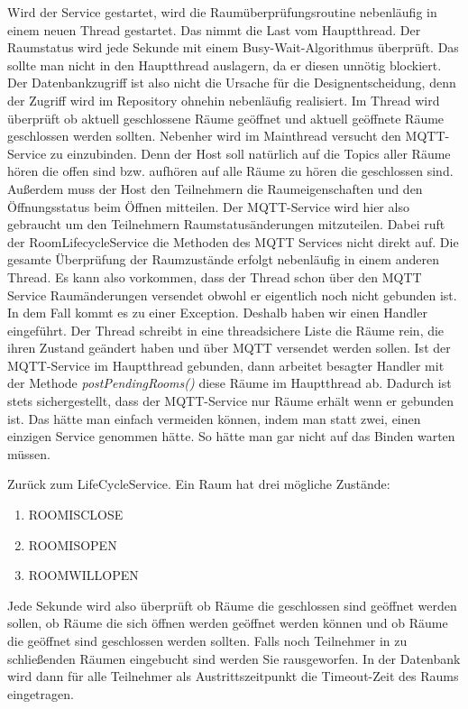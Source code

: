 Wird der Service gestartet, wird die Raumüberprüfungsroutine nebenläufig in einem neuen Thread gestartet. Das nimmt die Last vom Hauptthread. Der Raumstatus wird jede Sekunde mit einem Busy-Wait-Algorithmus überprüft. Das sollte man nicht in den Hauptthread auslagern, da er diesen unnötig blockiert. 
Der Datenbankzugriff ist also nicht die Ursache für die Designentscheidung, denn der Zugriff wird im Repository ohnehin nebenläufig realisiert.
Im Thread wird überprüft ob aktuell geschlossene Räume geöffnet und aktuell geöffnete Räume geschlossen werden sollten.
Nebenher wird im Mainthread versucht den MQTT-Service zu einzubinden. Denn der Host soll natürlich auf die Topics aller Räume hören die offen sind bzw. aufhören auf alle Räume zu hören die geschlossen sind.
Außerdem muss der Host den Teilnehmern die Raumeigenschaften und den Öffnungsstatus beim Öffnen mitteilen. Der MQTT-Service wird hier also gebraucht um den Teilnehmern Raumstatusänderungen mitzuteilen.
Dabei ruft der RoomLifecycleService die Methoden des MQTT Services nicht direkt auf. Die gesamte Überprüfung der Raumzustände erfolgt nebenläufig in einem anderen Thread. 
Es kann also vorkommen, dass der Thread schon über den MQTT Service Raumänderungen versendet obwohl er eigentlich noch nicht gebunden ist. In dem Fall kommt es zu einer Exception.
Deshalb haben wir einen Handler eingeführt. Der Thread schreibt in eine threadsichere Liste die Räume rein, die ihren Zustand geändert haben und über MQTT versendet werden sollen. 
Ist der MQTT-Service im Hauptthread gebunden, dann arbeitet besagter Handler mit der Methode \textit{postPendingRooms()} diese Räume im Hauptthread ab. 
Dadurch ist stets sichergestellt, dass der MQTT-Service nur Räume erhält wenn er gebunden ist. Das hätte man einfach vermeiden können, indem man statt zwei, einen einzigen Service genommen hätte. So hätte man gar nicht auf das Binden warten müssen.

Zurück zum LifeCycleService.
Ein Raum hat drei mögliche Zustände:
\begin{enumerate}
\item ROOMISCLOSE
\item ROOMISOPEN
\item ROOMWILLOPEN
\end{enumerate}
 Jede Sekunde wird also überprüft ob Räume die geschlossen sind geöffnet werden sollen, ob Räume die sich öffnen werden geöffnet werden können und ob Räume die geöffnet sind geschlossen werden sollten. 
Falls noch Teilnehmer in zu schließenden Räumen eingebucht sind werden Sie rausgeworfen. In der Datenbank wird dann für alle Teilnehmer als Austrittszeitpunkt die Timeout-Zeit des Raums eingetragen.


